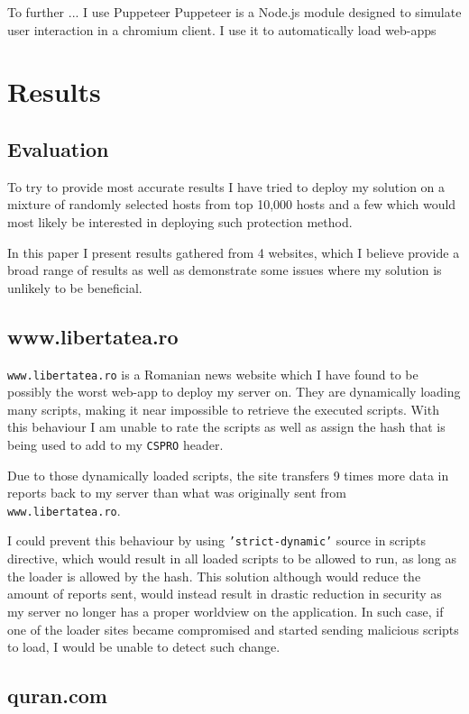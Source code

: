 To further ... I use Puppeteer
Puppeteer is a Node.js module designed to simulate user interaction in a chromium client.
I use it to automatically load web-apps 

\section{Results}

\subsection{Evaluation}

To try to provide most accurate results I have tried to deploy my solution on a mixture of randomly selected hosts from top 10,000 hosts and a few which would most likely be interested in deploying such protection method.

In this paper I present results gathered from 4 websites, which I believe provide a broad range of results as well as demonstrate some issues where my solution is unlikely to be beneficial.

\subsection{www.libertatea.ro}

\texttt{www.libertatea.ro} is a Romanian news website which I have found to be possibly the worst web-app to deploy my server on.
They are dynamically loading many scripts, making it near impossible to retrieve the executed scripts.
With this behaviour I am unable to rate the scripts as well as assign the hash that is being used to add to my \texttt{CSPRO} header.

Due to those dynamically loaded scripts, the site transfers 9 times more data in reports back to my server than what was originally sent from \texttt{www.libertatea.ro}.

I could prevent this behaviour by using \texttt{'strict-dynamic'} source in scripts directive, which would result in all loaded scripts to be allowed to run, as long as the loader is allowed by the hash.
This solution although would reduce the amount of reports sent, would instead result in drastic reduction in security as my server no longer has a proper worldview on the application.
In such case, if one of the loader sites became compromised and started sending malicious scripts to load, I would be unable to detect such change.

\subsection{quran.com}

